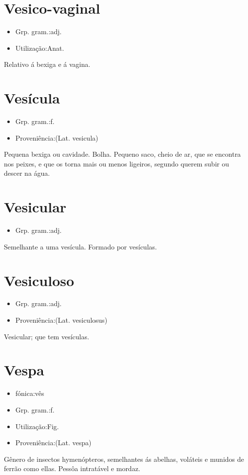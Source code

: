 \documentclass{article}
\begin{document}
\section{Vesico-vaginal}
\begin{itemize}
\item {Grp. gram.:adj.}
\end{itemize}
\begin{itemize}
\item {Utilização:Anat.}
\end{itemize}
Relativo á bexiga e á vagina.
\section{Vesícula}
\begin{itemize}
\item {Grp. gram.:f.}
\end{itemize}
\begin{itemize}
\item {Proveniência:(Lat. \textunderscore vesicula\textunderscore )}
\end{itemize}
Pequena bexiga ou cavidade.
Bolha.
Pequeno saco, cheio de ar, que se encontra nos peixes, e que os torna mais ou menos ligeiros, segundo querem subir ou descer na água.
\section{Vesicular}
\begin{itemize}
\item {Grp. gram.:adj.}
\end{itemize}
Semelhante a uma vesícula.
Formado por vesículas.
\section{Vesiculoso}
\begin{itemize}
\item {Grp. gram.:adj.}
\end{itemize}
\begin{itemize}
\item {Proveniência:(Lat. \textunderscore vesiculosus\textunderscore )}
\end{itemize}
Vesicular; que tem vesículas.
\section{Vespa}
\begin{itemize}
\item {fónica:vês}
\end{itemize}
\begin{itemize}
\item {Grp. gram.:f.}
\end{itemize}
\begin{itemize}
\item {Utilização:Fig.}
\end{itemize}
\begin{itemize}
\item {Proveniência:(Lat. \textunderscore vespa\textunderscore )}
\end{itemize}
Gênero de insectos hymenópteros, semelhantes ás abelhas, voláteis e munidos de ferrão como ellas.
Pessôa intratável e mordaz.
\end{document}
